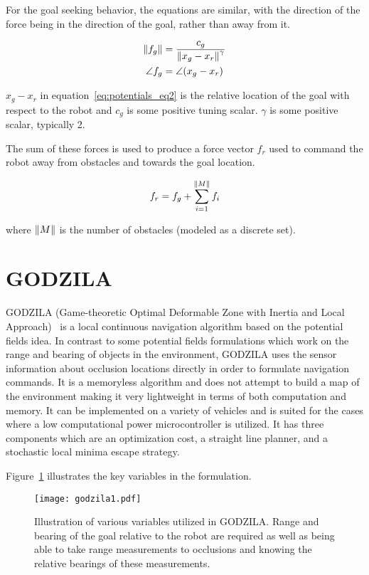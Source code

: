 For the goal seeking behavior, the equations are similar, with the direction of the force being in the direction of the 
goal, rather than away from it.

\begin{align}
	\left\lVert f_g\right\rVert  &= \frac{c_g}{\left\lVert x_g - x_r\right\rVert^\gamma}\\
	\angle{f_g} &= \angle(x_g - x_r)
\label{eq:potentials_eq2}
\end{align}

$x_g - x_r$ in equation~\ref{eq:potentials_eq2} is the relative location of the goal with respect to the robot and $c_g$ is some positive
tuning scalar. $\gamma$ is some positive scalar, typically 2.

The sum of these forces is used to produce a force vector $f_r$ used to command the robot away from obstacles and towards the goal
location. 

\begin{equation}
	f_r = f_g + \sum_{i = 1}^{\left\lVert M\right\rVert} f_i
\label{eq:potentials_eq3}
\end{equation}

where $\left\lVert M\right\rVert$ is the number of obstacles (modeled as a discrete set).

\section{GODZILA}\label{sec:navgodzila}

GODZILA (Game-theoretic Optimal Deformable Zone with Inertia and Local Approach)~\cite{Krishnamurthy2007} is a local 
continuous navigation algorithm based on the potential fields idea. In contrast to some potential fields formulations
which work on the range and bearing of objects in the environment, GODZILA uses the sensor information about occlusion
locations directly in order to formulate navigation commands. It is a memoryless algorithm and does not attempt to
build a map of the environment making it very lightweight in terms of both computation and memory. It can be implemented
on a variety of vehicles and is suited for the cases where a low computational power microcontroller is utilized.
It has three components which are an optimization cost, a straight line planner, and a stochastic local minima escape strategy.

Figure~\ref{fig:godzila_setup1} illustrates the key variables in the formulation.
\begin{figure}
\centering
\texttt{[image: godzila1.pdf]}
\caption{Illustration of various variables utilized in GODZILA\@. Range and bearing of the goal relative to the robot are required
         as well as being able to take range measurements to occlusions and knowing the relative bearings of these measurements.}
\label{fig:godzila_setup1}
\end{figure}


